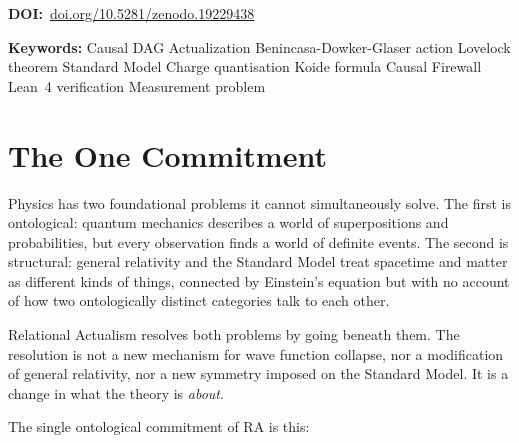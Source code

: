 \documentclass[11pt,a4paper]{article}
\begin{document}
\begin{titlepage}
\medskip\noindent
\textbf{DOI:}~\href{https://doi.org/10.5281/zenodo.19229438}{doi.org/10.5281/zenodo.19229438}

\medskip\noindent
\textbf{Keywords:} Causal DAG \textperiodcentered{} Actualization
\textperiodcentered{} Benincasa-Dowker-Glaser action \textperiodcentered{}
Lovelock theorem \textperiodcentered{} Standard Model \textperiodcentered{}
Charge quantisation \textperiodcentered{} Koide formula \textperiodcentered{}
Causal Firewall \textperiodcentered{} Lean~4 verification
\textperiodcentered{} Measurement problem

\end{titlepage}

\section{The One Commitment}
\label{sec:commitment}

Physics has two foundational problems it cannot simultaneously solve. The
first is ontological: quantum mechanics describes a world of superpositions and
probabilities, but every observation finds a world of definite events.
The second is structural: general relativity and the Standard Model treat
spacetime and matter as different kinds of things, connected by Einstein's
equation but with no account of how two ontologically distinct categories
talk to each other.

Relational Actualism resolves both problems by going beneath them. The resolution
is not a new mechanism for wave function collapse, nor a modification of
general relativity, nor a new symmetry imposed on the Standard Model.
It is a change in what the theory is \emph{about}.

The single ontological commitment of RA is this:

\medskip
\begin{center}
\end{center}
\medskip
\end{document}
